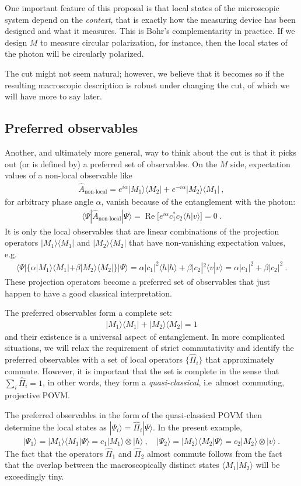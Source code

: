 \documentclass[12pt]{article}
\theoremstyle{plain}
\theoremstyle{definition}
\theoremstyle{remark}
\newcommand{\RE}{\operatorname{Re}}
\def\bra#1{\langle #1|}
\def\ket#1{| #1\rangle}
\newcommand{\EQ}[1]{\begin{equation}\begin{split} #1
\end{split}\end{equation}}
\begin{document}
One important feature of this proposal is that local states of the microscopic system depend on the {\it context\/}, that is exactly how the measuring device has been designed and what it measures. 
This is Bohr's complementarity in practice.
If we design $M$ to measure circular polarization, for instance, then the local states of the photon will be circularly polarized.  

The cut might not seem natural; however, we believe that it becomes so if the resulting macroscopic description is robust under changing the cut, of which we will have more to say later.

\subsection{Preferred observables}

Another, and ultimately more general, way to think about the cut is that it picks out (or is defined by) a preferred set of observables. On the $M$ side, expectation values of a non-local observable like
\EQ{
\hat A_\text{non-local}=e^{i\alpha}\ket{M_1}\bra{M_2}+e^{-i\alpha}\ket{M_2}\bra{M_1}\ ,
}
for arbitrary phase angle $\alpha$, vanish because of the entanglement with the photon:
\EQ{
\bra{\Psi}\hat A_\text{non-local}\ket{\Psi}=\RE\Big[e^{i\alpha}c_1^*c_2\bra{h}v\rangle\Big]=0\ .
\label{rrf}
}
It is only the local observables that are linear combinations of the projection operators $\ket{M_1}\bra{M_1}$ and $\ket{M_2}\bra{M_2}$ that have non-vanishing expectation values, e.g.
\EQ{
\bra{\Psi}\Big\{\alpha\ket{M_1}\bra{M_1}+\beta\ket{M_2}\bra{M_2}\Big\}\ket{\Psi}=\alpha|c_1|^2\bra{h}h\rangle+\beta|c_2|^2\bra{v}v\rangle=\alpha|c_1|^2+\beta|c_2|^2\ .
}
These projection operators become a preferred set of observables that just happen to have a good classical interpretation.

The preferred observables form a complete set:
\EQ{
\ket{M_1}\bra{M_1}+\ket{M_2}\bra{M_2}=1
} 
and their existence is a universal aspect of entanglement. 
In more complicated situations, we will relax the requirement of strict commutativity and identify the preferred observables with a set of local operators $\{\hat\Pi_i\}$ that approximately commute. However, it is important that the set is complete in the sense that $\sum_i\hat\Pi_i=1$, in other words, they form a {\it quasi-classical\/}, i.e~almost commuting, projective POVM.

The preferred observables in the form of the quasi-classical POVM then determine the local states as
$\ket{\Psi_i}=\hat\Pi_i\ket{\Psi}$. In the present example,
\EQ{
\ket{\Psi_1}=\ket{M_1}\bra{M_1}\Psi\rangle=c_1\ket{M_1}\otimes\ket{h}\ ,\quad
\ket{\Psi_2}=\ket{M_2}\bra{M_2}\Psi\rangle=c_2\ket{M_2}\otimes\ket{v}\ .
}
The fact that the operators $\hat\Pi_1$ and $\hat\Pi_2$ almost commute follows from the fact that the overlap between the macroscopically distinct states $\bra{M_1}M_2\rangle$ will be exceedingly tiny.
\end{document}
